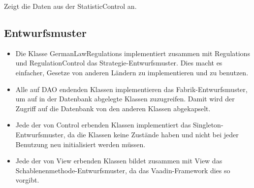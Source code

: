 \begin{itemize}
            \begin{itemize}
                    Zeigt die Daten aus der StatisticControl an.
            \end{itemize}

            \begin{itemize}
            \end{itemize}

        \end{itemize}

    \subsection{Entwurfsmuster}
        \begin{itemize}
            \item Die Klasse GermanLawRegulations implementiert zusammen mit Regulations und RegulationControl das Strategie-Entwurfsmuster.
                Dies macht es einfacher, Gesetze von anderen Ländern zu implementieren und zu benutzen.
            \item Alle auf DAO endenden Klassen implementieren das Fabrik-Entwurfsmuster, um auf in der Datenbank abgelegte Klassen zuzugreifen.
                Damit wird der Zugriff auf die Datenbank von den anderen Klassen abgekapselt.
            \item Jede der von Control erbenden Klassen implementiert das Singleton-Entwurfsmuster, da die Klassen keine Zustände haben und nicht bei jeder Benutzung neu initialisiert werden müssen.
            \item Jede der von View erbenden Klassen bildet zusammen mit View das Schablenenmethode-Entwurfsmuster, da das Vaadin-Framework dies so vorgibt.
        \end{itemize}
